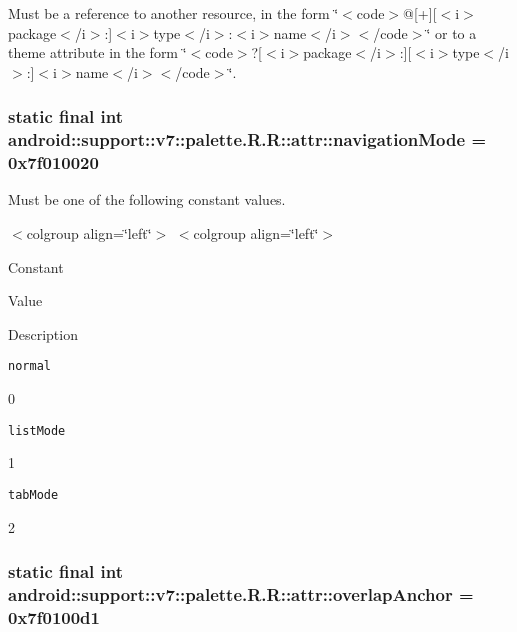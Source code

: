 Must be a reference to another resource, in the form \char`\"{}$<$code$>$@\mbox{[}+\mbox{]}\mbox{[}$<$i$>$package$<$/i$>$:\mbox{]}$<$i$>$type$<$/i$>$:$<$i$>$name$<$/i$>$$<$/code$>$\char`\"{} or to a theme attribute in the form \char`\"{}$<$code$>$?\mbox{[}$<$i$>$package$<$/i$>$:\mbox{]}\mbox{[}$<$i$>$type$<$/i$>$:\mbox{]}$<$i$>$name$<$/i$>$$<$/code$>$\char`\"{}. \hypertarget{classandroid_1_1support_1_1v7_1_1palette_1_1_r_1_1attr_13d648640d6bfd7c6af5eb2a8ce67a38}{
\subsubsection[{navigationMode}]{\setlength{\rightskip}{0pt plus 5cm}static final int android::support::v7::palette.R.R::attr::navigationMode = 0x7f010020}}
\label{classandroid_1_1support_1_1v7_1_1palette_1_1_r_1_1attr_13d648640d6bfd7c6af5eb2a8ce67a38}


Must be one of the following constant values. \begin{TabularC}{0}
\hline
\end{TabularC}
$<$colgroup align=\char`\"{}left\char`\"{}$>$ $<$colgroup align=\char`\"{}left\char`\"{}$>$ 

Constant

Value

Description 

{\tt normal}

0

{\tt listMode}

1

{\tt tabMode}

2\hypertarget{classandroid_1_1support_1_1v7_1_1palette_1_1_r_1_1attr_af67e96ca112047bf98cb41a8e1da1e0}{
\subsubsection[{overlapAnchor}]{\setlength{\rightskip}{0pt plus 5cm}static final int android::support::v7::palette.R.R::attr::overlapAnchor = 0x7f0100d1}}
\label{classandroid_1_1support_1_1v7_1_1palette_1_1_r_1_1attr_af67e96ca112047bf98cb41a8e1da1e0}


